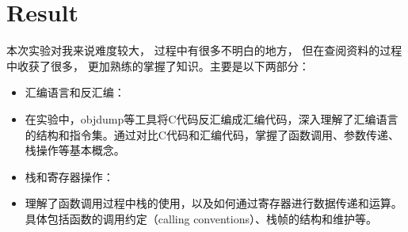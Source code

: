 



\section{Result}
本次实验对我来说难度较大，
过程中有很多不明白的地方，
但在查阅资料的过程中收获了很多，
更加熟练的掌握了知识。主要是以下两部分：

\begin{itemize}
  \item 汇编语言和反汇编：
  \item 在实验中，objdump等工具将C代码反汇编成汇编代码，深入理解了汇编语言的结构和指令集。通过对比C代码和汇编代码，掌握了函数调用、参数传递、栈操作等基本概念。
  \item 栈和寄存器操作：
  \item 理解了函数调用过程中栈的使用，以及如何通过寄存器进行数据传递和运算。具体包括函数的调用约定（calling conventions）、栈帧的结构和维护等。
\end{itemize}

